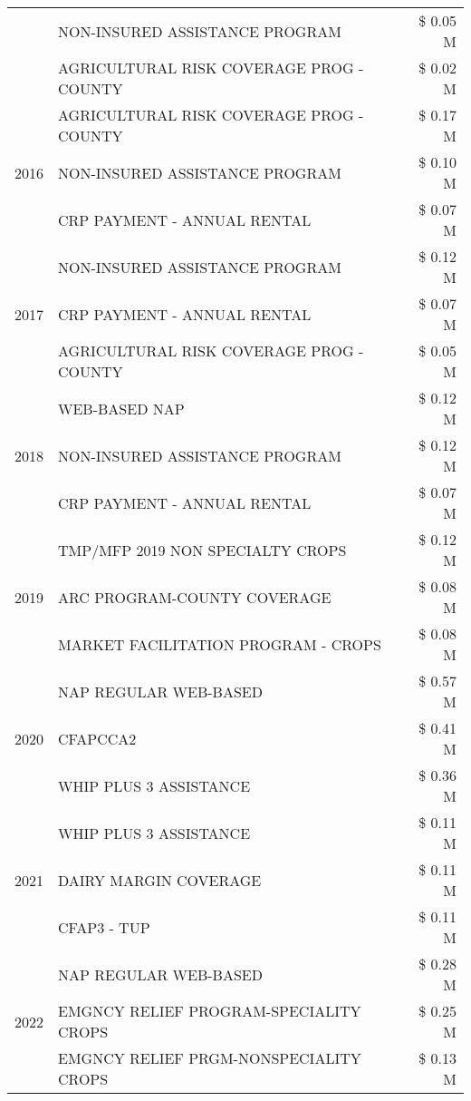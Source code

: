 \begin{tabular}{llr}
 & NON-INSURED ASSISTANCE PROGRAM & \$ 0.05 M \\
 & AGRICULTURAL RISK COVERAGE PROG - COUNTY & \$ 0.02 M \\
\cline{1-3}
\multirow[t]{3}{*}{2016} & AGRICULTURAL RISK COVERAGE PROG - COUNTY & \$ 0.17 M \\
 & NON-INSURED ASSISTANCE PROGRAM & \$ 0.10 M \\
 & CRP PAYMENT - ANNUAL RENTAL & \$ 0.07 M \\
\cline{1-3}
\multirow[t]{3}{*}{2017} & NON-INSURED ASSISTANCE PROGRAM & \$ 0.12 M \\
 & CRP PAYMENT - ANNUAL RENTAL & \$ 0.07 M \\
 & AGRICULTURAL RISK COVERAGE PROG - COUNTY & \$ 0.05 M \\
\cline{1-3}
\multirow[t]{3}{*}{2018} & WEB-BASED NAP & \$ 0.12 M \\
 & NON-INSURED ASSISTANCE PROGRAM & \$ 0.12 M \\
 & CRP PAYMENT - ANNUAL RENTAL & \$ 0.07 M \\
\cline{1-3}
\multirow[t]{3}{*}{2019} & TMP/MFP 2019 NON SPECIALTY CROPS & \$ 0.12 M \\
 & ARC PROGRAM-COUNTY COVERAGE & \$ 0.08 M \\
 & MARKET FACILITATION PROGRAM - CROPS & \$ 0.08 M \\
\cline{1-3}
\multirow[t]{3}{*}{2020} & NAP REGULAR WEB-BASED & \$ 0.57 M \\
 & CFAPCCA2 & \$ 0.41 M \\
 & WHIP PLUS 3 ASSISTANCE & \$ 0.36 M \\
\cline{1-3}
\multirow[t]{3}{*}{2021} & WHIP PLUS 3 ASSISTANCE & \$ 0.11 M \\
 & DAIRY MARGIN COVERAGE & \$ 0.11 M \\
 & CFAP3 - TUP & \$ 0.11 M \\
\cline{1-3}
\multirow[t]{3}{*}{2022} & NAP REGULAR WEB-BASED & \$ 0.28 M \\
 & EMGNCY RELIEF PROGRAM-SPECIALITY CROPS & \$ 0.25 M \\
 & EMGNCY RELIEF PRGM-NONSPECIALITY CROPS & \$ 0.13 M \\
\cline{1-3}
\bottomrule
\end{tabular}
